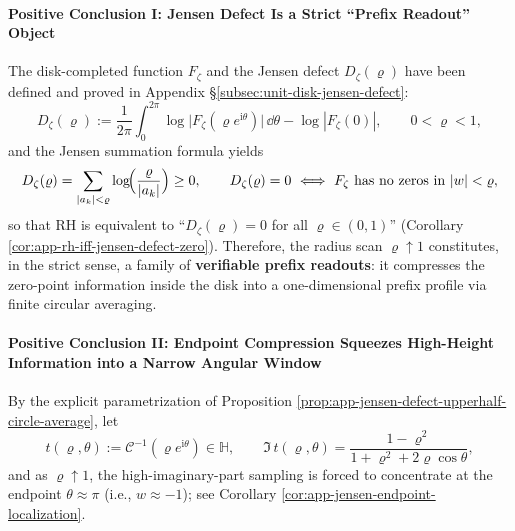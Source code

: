 \paragraph{Positive Conclusion I: Jensen Defect Is a Strict ``Prefix Readout'' Object}
The disk-completed function \(F_\zeta\) and the Jensen defect \(D_\zeta(\varrho)\) have been defined and proved in Appendix \S\ref{subsec:unit-disk-jensen-defect}:
\[
D_{\zeta}(\varrho)
  :=
\frac{1}{2\pi}\int_{0}^{2\pi}\log\bigl|F_{\zeta}(\varrho e^{\mathrm{i}\theta})\bigr|\,\dd\theta
-\log|F_{\zeta}(0)|,
\qquad 0<\varrho<1,
\]
and the Jensen summation formula yields
\[
D_{\zeta}(\varrho)=\sum_{|a_k|<\varrho}\log\!\Bigl(\frac{\varrho}{|a_k|}\Bigr)\ge 0,
\qquad
D_{\zeta}(\varrho)=0\ \Longleftrightarrow\ F_\zeta\ \text{has no zeros in}\ |w|<\varrho,
\]
so that RH is equivalent to ``\(D_\zeta(\varrho)=0\) for all \(\varrho\in(0,1)\)'' (Corollary \ref{cor:app-rh-iff-jensen-defect-zero}).
Therefore, the radius scan \(\varrho\uparrow 1\) constitutes, in the strict sense, a family of \textbf{verifiable prefix readouts}: it compresses the zero-point information inside the disk into a one-dimensional prefix profile via finite circular averaging.

\paragraph{Positive Conclusion II: Endpoint Compression Squeezes High-Height Information into a Narrow Angular Window}
By the explicit parametrization of Proposition \ref{prop:app-jensen-defect-upperhalf-circle-average}, let
\[
t(\varrho,\theta):=\mathcal{C}^{-1}(\varrho e^{\mathrm{i}\theta})\in\mathbb{H},
\qquad
\Im\,t(\varrho,\theta)=\frac{1-\varrho^2}{1+\varrho^2+2\varrho\cos\theta},
\]
and as \(\varrho\uparrow 1\), the high-imaginary-part sampling is forced to concentrate at the endpoint \(\theta\approx\pi\) (i.e., \(w\approx-1\)); see Corollary \ref{cor:app-jensen-endpoint-localization}.

